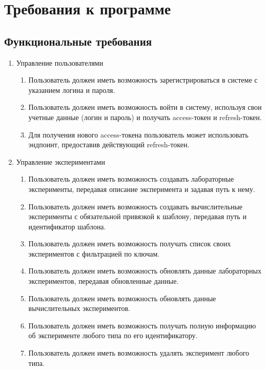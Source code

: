 \documentclass[a4paper,12pt,reqno]{article}
\begin{document}
    \section{Требования к программе}

    \subsection{Функциональные требования} \label{funcreq}

    \begin{enumerate}
        \item Управление пользователями

        \begin{enumerate}[label=\arabic{enumi}.\arabic*.]
            \item Пользователь должен иметь возможность зарегистрироваться в системе с указанием логина и пароля.
            \item Пользователь должен иметь возможность войти в систему, используя свои учетные данные (логин и пароль) и получать access-токен и refresh-токен.
            \item Для получения нового access-токена пользователь может использовать эндпоинт, предоставив действующий refresh-токен.
        \end{enumerate}

        \item Управление экспериментами

        \begin{enumerate}[label=\arabic{enumi}.\arabic*.]
            \item Пользователь должен иметь возможность создавать лабораторные эксперименты, передавая описание эксперимента и задавая путь к нему.
            \item Пользователь должен иметь возможность создавать вычислительные эксперименты с обязательной привязкой к шаблону, передавая путь и идентификатор шаблона.
            \item Пользователь должен иметь возможность получать список своих экспериментов с фильтрацией по ключам.
            \item Пользователь должен иметь возможность обновлять данные лабораторных экспериментов, передавая обновленные данные.
            \item Пользователь должен иметь возможность обновлять данные вычислительных экспериментов.
            \item Пользователь должен иметь возможность получать полную информацию об эксперименте любого типа по его идентификатору.
            \item Пользователь должен иметь возможность удалять эксперимент любого типа.
        \end{enumerate}


\end{enumerate}
\end{document}
